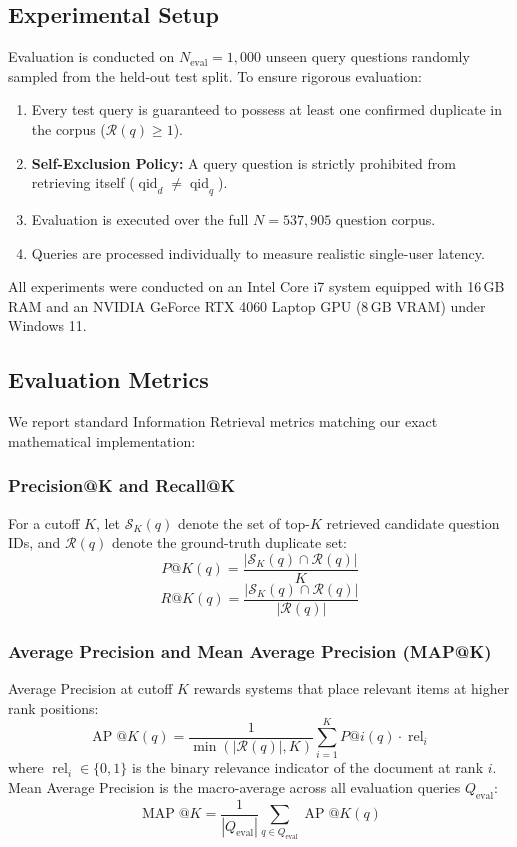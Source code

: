 \documentclass[11pt,a4paper]{article}
\begin{document}
\subsection{Experimental Setup}
Evaluation is conducted on $N_{\text{eval}} = 1,000$ unseen query questions randomly sampled from the held-out test split. To ensure rigorous evaluation:
\begin{enumerate}[noitemsep,topsep=1pt]
    \item Every test query is guaranteed to possess at least one confirmed duplicate in the corpus ($\mathcal{R}(q) \ge 1$).
    \item \textbf{Self-Exclusion Policy:} A query question is strictly prohibited from retrieving itself ($\operatorname{qid}_d \ne \operatorname{qid}_q$).
    \item Evaluation is executed over the full $N = 537,905$ question corpus.
    \item Queries are processed individually to measure realistic single-user latency.
\end{enumerate}
All experiments were conducted on an Intel Core i7 system equipped with 16\,GB RAM and an NVIDIA GeForce RTX 4060 Laptop GPU (8\,GB VRAM) under Windows 11.

\subsection{Evaluation Metrics}
We report standard Information Retrieval metrics matching our exact mathematical implementation:

\subsubsection{Precision@K and Recall@K}
For a cutoff $K$, let $\mathcal{S}_K(q)$ denote the set of top-$K$ retrieved candidate question IDs, and $\mathcal{R}(q)$ denote the ground-truth duplicate set:
\begin{equation}
P@K(q) = \frac{|\mathcal{S}_K(q) \cap \mathcal{R}(q)|}{K}
\end{equation}
\begin{equation}
R@K(q) = \frac{|\mathcal{S}_K(q) \cap \mathcal{R}(q)|}{|\mathcal{R}(q)|}
\end{equation}

\subsubsection{Average Precision and Mean Average Precision (MAP@K)}
Average Precision at cutoff $K$ rewards systems that place relevant items at higher rank positions:
\begin{equation}
\operatorname{AP}@K(q) = \frac{1}{\min(|\mathcal{R}(q)|, K)} \sum_{i=1}^{K} P@i(q) \cdot \operatorname{rel}_i
\end{equation}
where $\operatorname{rel}_i \in \{0, 1\}$ is the binary relevance indicator of the document at rank $i$. Mean Average Precision is the macro-average across all evaluation queries $Q_{\text{eval}}$:
\begin{equation}
\operatorname{MAP}@K = \frac{1}{|Q_{\text{eval}}|} \sum_{q \in Q_{\text{eval}}} \operatorname{AP}@K(q)
\end{equation}
\end{document}
